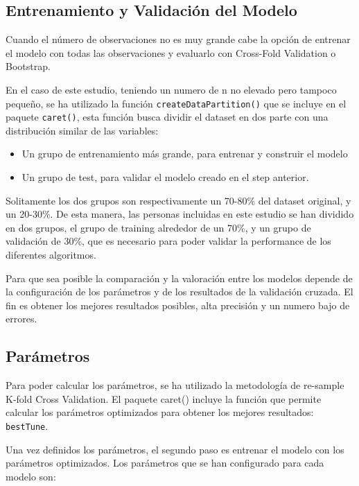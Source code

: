 \documentclass[
]{article}
\begin{document}
\hypertarget{entrenamiento-y-validaciuxf3n-del-modelo}{%
\subsection{Entrenamiento y Validación del
Modelo}\label{entrenamiento-y-validaciuxf3n-del-modelo}}

Cuando el número de observaciones no es muy grande cabe la opción de
entrenar el modelo con todas las observaciones y evaluarlo con
Cross-Fold Validation o Bootstrap.

En el caso de este estudio, teniendo un numero de n no elevado pero
tampoco pequeño, se ha utilizado la función
\texttt{createDataPartition()} que se incluye en el paquete
\texttt{caret()}, esta función busca dividir el dataset en dos parte con
una distribución similar de las variables:

\begin{itemize}
\item
  Un grupo de entrenamiento más grande, para entrenar y construir el
  modelo
\item
  Un grupo de test, para validar el modelo creado en el step anterior.
\end{itemize}

Solitamente los dos grupos son respectivamente un 70-80\% del dataset
original, y un 20-30\%. De esta manera, las personas incluidas en este
estudio se han dividido en dos grupos, el grupo de training alrededor de
un 70\%, y un grupo de validación de 30\%, que es necesario para poder
validar la performance de los diferentes algoritmos.

Para que sea posible la comparación y la valoración entre los modelos
depende de la configuración de los parámetros y de los resultados de la
validación cruzada. El fin es obtener los mejores resultados posibles,
alta precisión y un numero bajo de errores.

\hypertarget{paruxe1metros}{%
\subsection{Parámetros}\label{paruxe1metros}}

Para poder calcular los parámetros, se ha utilizado la metodología de
re-sample K-fold Cross Validation. El paquete caret() incluye la función
que permite calcular los parámetros optimizados para obtener los mejores
resultados: \texttt{bestTune}.

Una vez definidos los parámetros, el segundo paso es entrenar el modelo
con los parámetros optimizados. Los parámetros que se han configurado
para cada modelo son:
\end{document}
